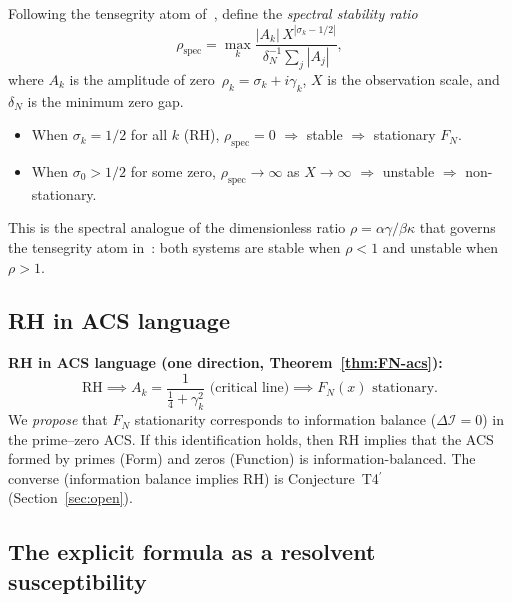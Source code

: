 \documentclass[11pt,a4paper]{article}
\theoremstyle{plain}
\theoremstyle{definition}
\theoremstyle{remark}
\newcommand{\DI}{\Delta\mathcal{I}}
\begin{document}
Following the tensegrity atom of~\cite{Wallace2026a}, define the
\emph{spectral stability ratio}
\begin{equation}\label{eq:rho-spec}
  \rho_{\mathrm{spec}} = \max_k \frac{|A_k|\,X^{|\sigma_k - 1/2|}}%
    {\delta_N^{-1}\sum_j |A_j|},
\end{equation}
where $A_k$ is the amplitude of zero~$\rho_k = \sigma_k + i\gamma_k$,
$X$ is the observation scale, and $\delta_N$ is the minimum zero gap.
\begin{itemize}[noitemsep]
  \item When $\sigma_k = 1/2$ for all $k$ (RH), $\rho_{\mathrm{spec}} = 0$
    $\Rightarrow$ stable $\Rightarrow$ stationary $F_N$.
  \item When $\sigma_0 > 1/2$ for some zero, $\rho_{\mathrm{spec}} \to \infty$
    as $X \to \infty$ $\Rightarrow$ unstable $\Rightarrow$ non-stationary.
\end{itemize}
This is the spectral analogue of the dimensionless ratio
$\rho = \alpha\gamma/\beta\kappa$ that governs the tensegrity atom
in~\cite{Wallace2026a}: both systems are stable when $\rho < 1$
and unstable when $\rho > 1$.

\subsection{RH in ACS language}

\textbf{RH in ACS language (one direction, Theorem~\ref{thm:FN-acs}):}
\begin{equation}
  \mathrm{RH} \implies A_k = \frac{1}{\tfrac{1}{4}+\gamma_k^2} \text{ (critical line)}
             \implies F_N(x) \text{ stationary.}
\end{equation}
We \emph{propose} that $F_N$ stationarity corresponds to information balance 
($\DI = 0$) in the prime--zero ACS.  If this identification holds, then 
RH implies that the ACS formed by primes (Form) and zeros (Function) 
is information-balanced.  The converse (information balance implies RH) 
is Conjecture~T4$^\prime$ (Section~\ref{sec:open}).


\subsection{The explicit formula as a resolvent susceptibility}
\label{sec:resolvent}
\end{document}
